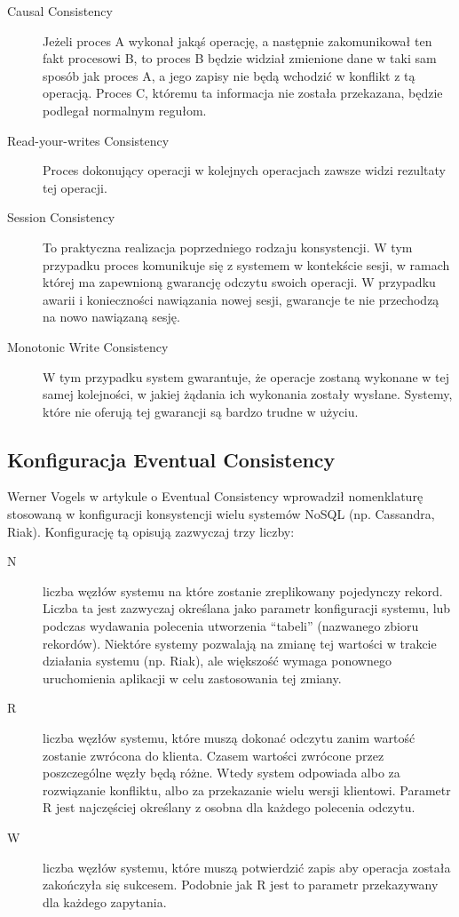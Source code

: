 \begin{description}
 \item[Causal Consistency] 
 Jeżeli proces A wykonał jakąś operację, a następnie zakomunikował ten fakt procesowi B, to proces B będzie widział zmienione dane w taki sam sposób jak proces A, a jego zapisy nie będą wchodzić w konflikt z tą operacją.
 Proces C, któremu ta informacja nie została przekazana, będzie podlegał normalnym regułom.
 \item[Read-your-writes Consistency]
 Proces dokonujący operacji w kolejnych operacjach zawsze widzi rezultaty tej operacji.
 \item[Session Consistency]
 To praktyczna realizacja poprzedniego rodzaju konsystencji.
 W tym przypadku proces komunikuje się z systemem w kontekście sesji, w ramach której ma zapewnioną gwarancję odczytu swoich operacji.
 W przypadku awarii i konieczności nawiązania nowej sesji, gwarancje te nie przechodzą na nowo nawiązaną sesję.
 \item[Monotonic Write Consistency]
 W tym przypadku system gwarantuje, że operacje zostaną wykonane w tej samej kolejności, w jakiej żądania ich wykonania zostały wysłane.
 Systemy, które nie oferują tej gwarancji są bardzo trudne w użyciu.
\end{description}

\subsection*{Konfiguracja Eventual Consistency}

Werner Vogels w artykule o Eventual Consistency \cite{vogels-eventually-consistent} wprowadził nomenklaturę stosowaną w konfiguracji konsystencji wielu systemów NoSQL (np. Cassandra, Riak).
Konfigurację tą opisują zazwyczaj trzy liczby:

\begin{description}
 \item[N] liczba węzłów systemu na które zostanie zreplikowany pojedynczy rekord.
 Liczba ta jest zazwyczaj określana jako parametr konfiguracji systemu, lub podczas wydawania polecenia utworzenia ``tabeli'' (nazwanego zbioru rekordów).
 Niektóre systemy pozwalają na zmianę tej wartości w trakcie działania systemu (np. Riak), ale większość wymaga ponownego uruchomienia aplikacji w celu zastosowania tej zmiany.
 \item[R] liczba węzłów systemu, które muszą dokonać odczytu zanim wartość zostanie zwrócona do klienta.
 Czasem wartości zwrócone przez poszczególne węzły będą różne.
 Wtedy system  odpowiada albo za rozwiązanie konfliktu, albo za przekazanie wielu wersji klientowi.
 Parametr R jest najczęściej określany z osobna dla każdego polecenia odczytu.
 \item[W] liczba węzłów systemu, które muszą potwierdzić zapis aby operacja została zakończyła się sukcesem.
 Podobnie jak R jest to parametr przekazywany dla każdego zapytania.
\end{description}

